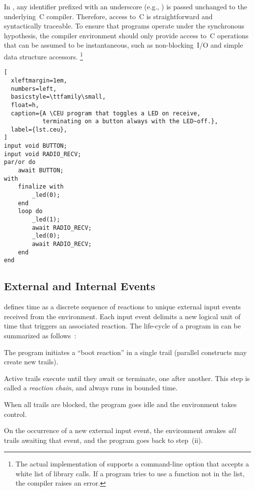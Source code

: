 In \CEU, any identifier prefixed with an underscore (e.g., ) is
passed unchanged to the underlying~C compiler.
%
Therefore, access to~C is straightforward and syntactically traceable.
%
To ensure that programs operate under the synchronous hypothesis, the compiler
environment should only provide access to~C operations that can be assumed to
be instantaneous, such as non-blocking~I/O and simple data structure accessors.%
\footnote {
The actual implementation of \CEU supports a command-line option that accepts a
white list of library calls.
If a program tries to use a function not in the list, the compiler raises an
error.
}

\begin{lstlisting}[
  xleftmargin=1em,
  numbers=left,
  basicstyle=\ttfamily\small,
  float=h,
  caption={A \CEU program that toggles a LED on receive,
           terminating on a button always with the LED~off.},
  label={lst.ceu},
]
input void BUTTON;
input void RADIO_RECV;
par/or do
    await BUTTON;
with
    finalize with
        _led(0);
    end
    loop do
        _led(1);
        await RADIO_RECV;
        _led(0);
        await RADIO_RECV;
    end
end
\end{lstlisting}

\subsection{External and Internal Events}
\label{sec.ceu.evts}

\CEU defines time as a discrete sequence of reactions to unique external
input events received from the environment.
%
Each input event delimits a new logical unit of time that triggers an
associated reaction.
%
The life-cycle of a program in \CEU can be summarized as
follows~\cite{ceu.sensys13}:
%
\begin{enumerate:i}
\item The program initiates a ``boot reaction'' in a single trail (parallel
      constructs may create new trails).
\item Active trails execute until they await or terminate, one after
      another.  This step is called a \emph{reaction chain}, and always runs in
      bounded time.
\item When all trails are blocked, the program goes idle and the environment
      takes control.
\item On the occurrence of a new external input event, the environment
      awakes \emph{all} trails awaiting that event, and the program goes back to
      step~(ii).
\end{enumerate:i}

